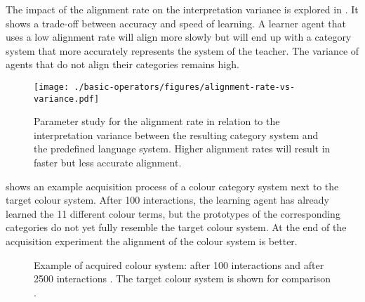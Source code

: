 The impact of the alignment rate on the interpretation variance is
explored in . It shows a
trade-off between accuracy and speed of learning. A learner agent that
uses a low alignment rate will align more slowly but will end up
with a category system that more accurately represents the system of
the teacher. The variance of agents that do not align their categories
remains high.

\begin{figure}[htbp]
  \begin{center}
    \texttt{[image: ./basic-operators/figures/alignment-rate-vs-variance.pdf]}
    \caption[Parameter study for alignment rate]{Parameter study for
      the alignment rate in relation to the interpretation variance
      between the resulting category system and the predefined
      language system. Higher alignment rates will result in faster
      but less accurate alignment.}
    \label{f:basic-strategy-alignment-rate-vs-variance}
  \end{center}
\end{figure}

 shows an example
acquisition process of a colour category system next to the target
colour system. After 100 interactions, the learning agent has already
learned the 11 different colour terms, but the prototypes of the
corresponding categories do not yet fully resemble the target colour
system. At the end of the acquisition experiment the alignment of the
colour system is better.

\begin{figure}[htbp]
\centering
{}
\caption[Example of an acquired and target colour system]{Example of
  acquired colour system: after 100 interactions
   and after 2500
  interactions . The target
  colour system is shown for comparison
  .}
\label{f:basic-strategy-acquisition-lexicon}
\end{figure}

